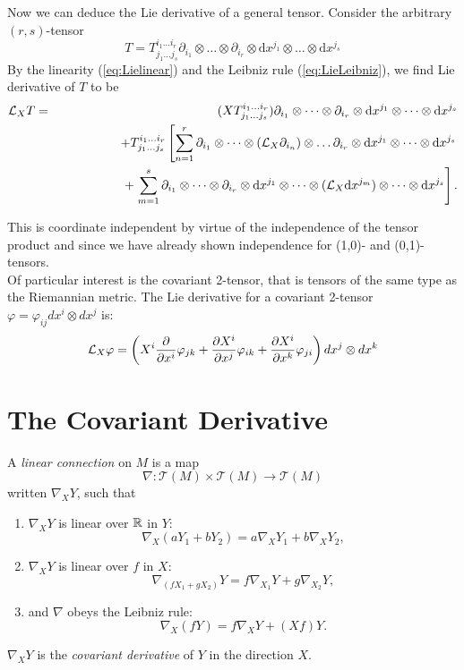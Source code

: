 Now we can deduce the Lie derivative of a general tensor. Consider the arbitrary $(r,s)$-tensor 
\[ T=T^{i_1\dots i_r}_{j_1\dots j_s}\partial_{i_1}\otimes \dots \otimes \partial_{i_r}\otimes \mbox{d}x^{j_1}\otimes \dots \otimes \mbox{d}x^{j_s} \]
By the linearity (\ref{eq:Lielinear}) and the Leibniz rule (\ref{eq:LieLeibniz}), we find Lie derivative of $T$ to be
\begin{eqnarray*}
{\mathcal{L}}_X T&=& (XT^{i_1\dots i_r}_{j_1\dots j_s})\partial_{i_1}\otimes \dots \otimes \partial_{i_r}\otimes \mbox{d}x^{j_1}\otimes \dots \otimes \mbox{d}x^{j_s}\\
& & \hspace{1.2cm} + T^{i_1\dots i_r}_{j_1\dots j_s}\left[\sum^{r}_{n=1}\partial_{i_1}\otimes \dots \otimes ({\mathcal{L}}_X \partial_{i_n}) \otimes \dots \partial_{i_r}\otimes \mbox{d}x^{j_1}\otimes \dots \otimes \mbox{d}x^{j_s} \right. \\
& & \hspace{1.8cm} + \left. \sum^{s}_{m=1}\partial_{i_1}\otimes \dots \otimes \partial_{i_r}\otimes \mbox{d}x^{j_1}\otimes \dots \otimes ({\mathcal{L}}_X \mbox{d}x^{j_m})\otimes \dots \otimes \mbox{d}x^{j_s} \right].
\end{eqnarray*}

This is coordinate independent by virtue of the independence of the tensor product and since we have already shown independence for (1,0)- and (0,1)-tensors.\\

Of particular interest is the covariant 2-tensor, that is tensors of the same type as the Riemannian metric. The Lie derivative for a covariant 2-tensor $\varphi =\varphi_{ij} dx^i \otimes dx^j$ is:
\begin{equation}{\mathcal{L}}_X \varphi = \left( X^i \frac{\partial}{\partial x^i}\varphi_{jk} + \frac{\partial X^i}{\partial x^j}\varphi_{ik} + \frac{\partial X^i}{\partial x^k}\varphi_{ji}\right)dx^j \otimes dx^k \label{eq:LieCov2}\end{equation}

\section{The Covariant Derivative}

A \textit{linear connection} on $M$ is a map
\[ \nabla:\mathcal{T}(M)\times \mathcal{T}(M) \rightarrow \mathcal{T}(M) \]
written $\nabla_X Y$, such that 
\begin{enumerate}
\item $\nabla_X Y$ is linear over ${\mathbb R}$ in $Y$:
\[ \nabla_X (aY_1+bY_2)=a\nabla_X Y_1 +b\nabla_X Y_2, \]
\item $\nabla_X Y$ is linear over $f$ in $X$:
\[ \nabla_{(fX_1+gX_2)} Y=f\nabla_{X_1} Y+g\nabla_{X_2} Y, \]
\item and $\nabla$ obeys the Leibniz rule:\[ \nabla_X (fY)=f\nabla_X Y + (Xf)Y. \]
\end{enumerate}
$\nabla_X Y$ is the \textit{covariant derivative} of $Y$ in the direction $X$.\\ 

